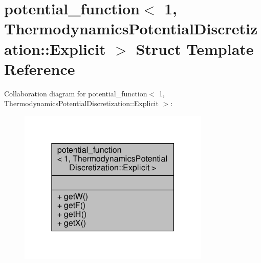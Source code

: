 \hypertarget{structpotential__function_3_011_00_01ThermodynamicsPotentialDiscretization_1_1Explicit_01_4}{}\section{potential\+\_\+function$<$ 1, Thermodynamics\+Potential\+Discretization\+:\+:Explicit $>$ Struct Template Reference}
\label{structpotential__function_3_011_00_01ThermodynamicsPotentialDiscretization_1_1Explicit_01_4}


Collaboration diagram for potential\+\_\+function$<$ 1, Thermodynamics\+Potential\+Discretization\+:\+:Explicit $>$\+:\nopagebreak
\begin{figure}[H]
\begin{center}
\leavevmode
\includegraphics[width=259pt]{structpotential__function_3_011_00_01ThermodynamicsPotentialDiscretization_1_1Explicit_01_4__coll__graph}
\end{center}
\end{figure}
